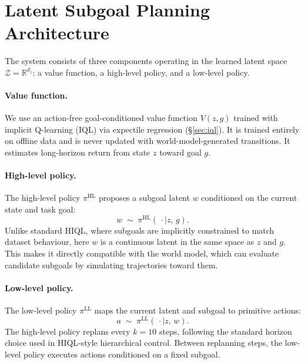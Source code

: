 \section{Latent Subgoal Planning Architecture}
\label{sec:lsp-architecture}

The system consists of three components operating in the learned latent space $\mathcal{Z} = \mathbb{R}^{d_z}$: a value function, a high-level policy, and a low-level policy.

\paragraph{Value function.}
We use an action-free goal-conditioned value function $V(z, g)$ trained with implicit Q-learning (IQL) via expectile regression (\S\ref{sec:iql}). It is trained entirely on offline data and is never updated with world-model-generated transitions. It estimates long-horizon return from state $z$ toward goal $g$.

\paragraph{High-level policy.}
The high-level policy $\pi^{\mathrm{HL}}$ proposes a subgoal latent $w$ conditioned on the current state and task goal:
\begin{equation}
w \;\sim\; \pi^{\mathrm{HL}}(\,\cdot\mid z,\,g).
\end{equation}
Unlike standard HIQL, where subgoals are implicitly constrained to match dataset behaviour, here $w$ is a continuous latent in the same space as $z$ and $g$. This makes it directly compatible with the world model, which can evaluate candidate subgoals by simulating trajectories toward them.

\paragraph{Low-level policy.}
The low-level policy $\pi^{\mathrm{LL}}$ maps the current latent and subgoal to primitive actions:
\begin{equation}
a \;\sim\; \pi^{\mathrm{LL}}(\,\cdot\mid z,\,w).
\end{equation}
The high-level policy replans every $k=10$ steps, following the standard horizon choice used in HIQL-style hierarchical control. Between replanning steps, the low-level policy executes actions conditioned on a fixed subgoal.

